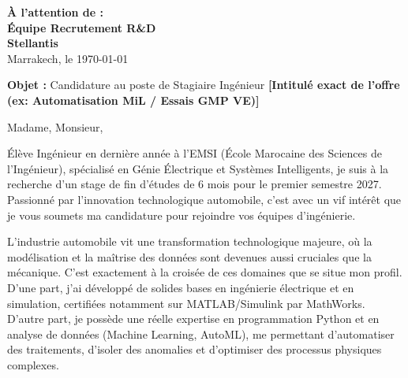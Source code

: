 \documentclass[10pt,a4paper]{altacv}
\makeatletter
\renewcommand{\makecvheader}{%
  \begingroup
    \raggedright\color{emphasis}%
    {\Huge\bfseries\MakeUppercase{\@name}\par}
    \medskip
    {\large\bfseries\color{accent}\@tagline\par}
    \medskip
    {\footnotesize\bfseries\@personalinfo\par}
  \endgroup\medskip
}
\makeatother
\begin{document}

\makecvheader

\bigskip

\begin{flushright}
  {\color{emphasis}\textbf{À l'attention de :}} \\[2pt]
  \textbf{Équipe Recrutement R\&D} \\
  \textbf{Stellantis} \\[20pt]
  Marrakech, le \today
\end{flushright}
\bigskip

\bigskip

{\color{accent}\textbf{Objet :}} Candidature au poste de Stagiaire Ingénieur \textcolor{StellantisRed}{\textbf{[Intitulé exact de l'offre (ex: Automatisation MiL / Essais GMP VE)]}}

\bigskip\bigskip

Madame, Monsieur,

\vspace{0.4cm}

Élève Ingénieur en dernière année à l'EMSI (École Marocaine des Sciences de l'Ingénieur), spécialisé en Génie Électrique et Systèmes Intelligents, je suis à la recherche d'un stage de fin d'études de 6 mois pour le premier semestre 2027. Passionné par l'innovation technologique automobile, c'est avec un vif intérêt que je vous soumets ma candidature pour rejoindre vos équipes d'ingénierie.

\vspace{0.4cm}

L'industrie automobile vit une transformation technologique majeure, où la modélisation et la maîtrise des données sont devenues aussi cruciales que la mécanique. C'est exactement à la croisée de ces domaines que se situe mon profil. D'une part, j'ai développé de solides bases en ingénierie électrique et en simulation, certifiées notamment sur MATLAB/Simulink par MathWorks. D'autre part, je possède une réelle expertise en programmation Python et en analyse de données (Machine Learning, AutoML), me permettant d'automatiser des traitements, d'isoler des anomalies et d'optimiser des processus physiques complexes.
\end{document}
